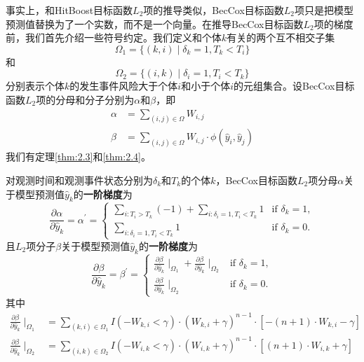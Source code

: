 事实上，和HitBoost目标函数$L_2$项的推导类似，BecCox目标函数$L_2$项只是把模型预测值替换为了一个实数，而不是一个向量。在推导BecCox目标函数$L_2$项的梯度前，我们首先介绍一些符号约定。我们定义和个体$k$有关的两个互不相交子集$$
\Omega_1=\{(k,i) \mid \delta_k=1,T_k < T_i\}
$$
和$$
\Omega_2=\{(i,k) \mid \delta_i=1,T_i < T_k\}
$$
分别表示个体$k$的发生事件风险大于个体$i$和小于个体$i$的元组集合。设BecCox目标函数$L_2$项的分母和分子分别为$\alpha$和$\beta$，即\[
\begin{split}
\alpha &= \sum_{(i,j)\in \Omega} W_{i,j}\\
\beta &= \sum_{(i,j)\in \Omega} W_{i,j} \cdot \phi\left(\hat{y}_i, \hat{y}_j \right)
\end{split}
\]
我们有定理\ref{thm:2.3}和\ref{thm:2.4}。

\begin{theorem}\label{thm:2.3}
对观测时间和观测事件状态分别为$\delta_k$和$T_k$的个体$k$，BecCox目标函数$L_2$项分母$\alpha$关于模型预测值$\hat{y}_k$的\textbf{一阶梯度}为$$
\frac{\partial \alpha}{\partial \hat{y}_k}=\alpha^{'}=
\begin{cases}
\sum\limits_{i: T_i>T_k}(-1) + \sum\limits_{i: \delta_i=1,T_i<T_k} 1 & \text{if } \delta_k = 1,\\
\sum\limits_{i: \delta_i=1,T_i<T_k} 1 & \text{if } \delta_k = 0.
\end{cases}
$$ 且$L_2$项分子$\beta$关于模型预测值$\hat{y}_k$的\textbf{一阶梯度}为$$
\frac{\partial \beta}{\partial \hat{y}_k}=\beta^{'}=
\begin{cases}
\frac{\partial \beta}{\partial \hat{y}_k} \mid_{\Omega_1} + \frac{\partial \beta}{\partial \hat{y}_k} \mid_{\Omega_2} & \text{if } \delta_k = 1,\\
\frac{\partial \beta}{\partial \hat{y}_k} \mid_{\Omega_2} & \text{if } \delta_k = 0.
\end{cases}
$$ 其中\[
\begin{split}
\frac{\partial \beta}{\partial \hat{y}_k} \mid_{\Omega_1} &= \sum\limits_{(k,i)\in \Omega_1} {I(-W_{k,i}<\gamma)\cdot (W_{k,i}+\gamma)^{n-1}\cdot [-(n+1)\cdot W_{k,i}-\gamma]} \\
\frac{\partial \beta}{\partial \hat{y}_k} \mid_{\Omega_2} &= \sum\limits_{(i,k)\in \Omega_2} {I(-W_{i,k}<\gamma)\cdot (W_{i,k}+\gamma)^{n-1}\cdot [(n+1)\cdot W_{i,k}+\gamma]}
\end{split}
\]
\end{theorem}

